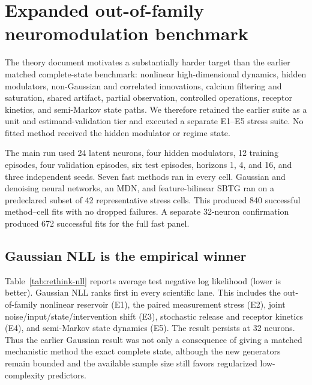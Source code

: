 \section{Expanded out-of-family neuromodulation benchmark}
\label{sec:rethink-results}

The theory document motivates a substantially harder target than the earlier matched
complete-state benchmark: nonlinear high-dimensional dynamics, hidden modulators,
non-Gaussian and correlated innovations, calcium filtering and saturation, shared
artifact, partial observation, controlled operations, receptor kinetics, and
semi-Markov state paths. We therefore retained the earlier suite as a unit and
estimand-validation tier and executed a separate E1--E5 stress suite. No fitted method
received the hidden modulator or regime state.

The main run used 24 latent neurons, four hidden modulators, 12 training episodes, four
validation episodes, six test episodes, horizons 1, 4, and 16, and three independent
seeds. Seven fast methods ran in every cell. Gaussian and denoising neural networks,
an MDN, and feature-bilinear SBTG ran on a predeclared subset of 42 representative
stress cells. This produced 840 successful method--cell fits with no dropped failures.
A separate 32-neuron confirmation produced 672 successful fits for the full fast panel.

\subsection{Gaussian NLL is the empirical winner}

Table~\ref{tab:rethink-nll} reports average test negative log likelihood (lower is
better). Gaussian NLL ranks first in every scientific lane. This includes the
out-of-family nonlinear reservoir (E1), the paired measurement stress (E2), joint
noise/input/state/intervention shift (E3), stochastic release and receptor kinetics
(E4), and semi-Markov state dynamics (E5). The result persists at 32 neurons. Thus the
earlier Gaussian result was not only a consequence of giving a matched mechanistic
method the exact complete state, although the new generators remain bounded and the
available sample size still favors regularized low-complexity predictors.

